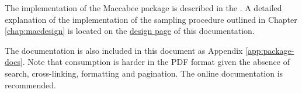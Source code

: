 \documentclass[../main.tex]{subfiles}
\begin{document}

The implementation of the Maccabee package is described in the . A detailed explanation of the implementation of the sampling procedure outlined in Chapter \ref{chap:macdesign} is located on the \href{\RTDurl/design.html}{design page} of this documentation.

\vspace{\baselineskip}

The documentation is also included in this document as Appendix \ref{app:package-docs}. Note that consumption is harder in the PDF format given the absence of search, cross-linking, formatting and pagination. The online documentation is recommended.
\end{document}
